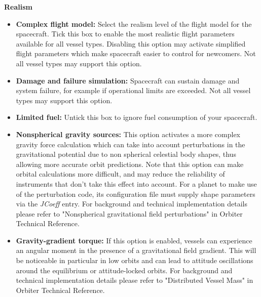 \documentclass[Orbiter User Manual.tex]{subfiles}
\begin{document}
\begin{figure}[H]
	\centering
\end{figure}

\noindent
\textbf{Realism}

\begin{itemize}
\item \textbf{Complex flight model:} Select the realism level of the flight model for the spacecraft. Tick this box to enable the most realistic flight parameters available for all vessel types. Disabling this option may activate simplified flight parameters which make spacecraft easier to control for newcomers. Not all vessel types may support this option.
\item \textbf{Damage and failure simulation:} Spacecraft can sustain damage and system failure, for example if operational limits are exceeded. Not all vessel types may support this option.
\item \textbf{Limited fuel:} Untick this box to ignore fuel consumption of your spacecraft.
\item \textbf{Nonspherical gravity sources:} This option activates a more complex gravity force calculation which can take into account perturbations in the gravitational potential due to non spherical celestial body shapes, thus allowing more accurate orbit predictions. Note that this option can make orbital calculations more difficult, and may reduce the reliability of instruments that don't take this effect into account. For a planet to make use of the perturbation code, its configuration file must supply shape parameters via the \textit{JCoeff} entry. For background and technical implementation details please refer to "Nonspherical gravitational field perturbations" in Orbiter Technical Reference.
\item \textbf{Gravity-gradient torque:} If this option is enabled, vessels can experience an angular moment in the presence of a gravitational field gradient. This will be noticeable in particular in low orbits and can lead to attitude oscillations around the equilibrium or attitude-locked orbits. For background and technical implementation details please refer to "Distributed Vessel Mass" in Orbiter Technical Reference.
\end{itemize}
\end{document}
